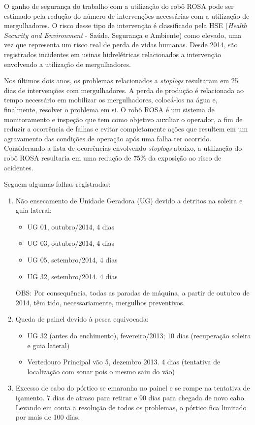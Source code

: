 O ganho de segurança do trabalho com a utilização do robô ROSA pode ser estimado
pela redução do número de intervenções necessárias com a utilização de
mergulhadores. O risco desse tipo de intervenção é classificado pela HSE
(\textit{Health Security and Environment} - Saúde, Segurança e Ambiente) como
elevado, uma vez que representa um risco real de perda de vidas humanas. Desde
2014, são registrados incidentes em usinas hidrelétricas relacionados a
intervenção envolvendo a utilização de mergulhadores. 

Nos últimos dois anos, os problemas relacionados a \textit{stoplogs}
resultaram em 25 dias de intervenções com mergulhadores. A perda de
produção é relacionada ao tempo necessário em mobilizar os mergulhadores,
colocá-los na água e, finalmente, resolver o problema em si. O robô ROSA é um
sistema de monitoramento e inspeção que tem como objetivo auxiliar o
operador, a fim de reduzir a ocorrência de falhas e evitar completamente ações
que resultem em um agravamento das condições de operação após uma falha ter
ocorrido. Considerando a lista de ocorrências envolvendo \textit{stoplogs}
abaixo, a utilização do robô ROSA resultaria em uma redução de 75\% da
exposição ao risco de acidentes.

Seguem algumas falhas registradas:
\begin{enumerate}
\item Não ensecamento de Unidade Geradora (UG) devido a detritos na soleira e
guia lateral:
\begin{itemize}
\item UG 01, outubro/2014, 4 dias
\item UG 03, outubro/2014, 4 dias
\item UG 05, setembro/2014, 4 dias
\item UG 32, setembro/2014. 4 dias	
\end{itemize}
OBS: Por consequência, todas as paradas de máquina, a partir de
outubro de 2014, têm tido, necessariamente, mergulhos
preventivos. 
\item Queda de painel devido à pesca equivocada:
\begin{itemize}
\item UG 32 (antes do enchimento), fevereiro/2013; 10 dias (recuperação
soleira e guia lateral)
\item Vertedouro Principal vão 5, dezembro 2013. 4 dias (tentativa de
localização com sonar pois o mesmo saiu do vão)
\end{itemize}
\item Excesso de cabo do pórtico se emaranha no painel e se rompe na
tentativa de içamento. 7 dias de atraso para retirar e 90 dias para chegada de
novo cabo. Levando em conta a resolução de todos os problemas, o pórtico fica limitado por mais de 100 dias.
\end{enumerate}

